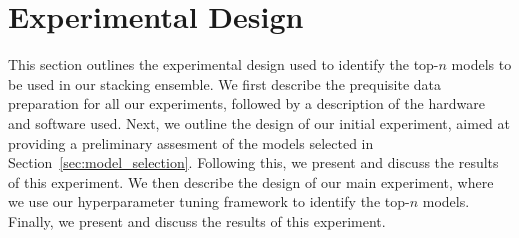 \section{Experimental Design}\label{sec:methodology}
This section outlines the experimental design used to identify the top-$n$ models to be used in our stacking ensemble.
We first describe the prequisite data preparation for all our experiments, followed by a description of the hardware and software used.
Next, we outline the design of our initial experiment, aimed at providing a preliminary assesment of the models selected in Section~\ref{sec:model_selection}.
Following this, we present and discuss the results of this experiment.
We then describe the design of our main experiment, where we use our hyperparameter tuning framework to identify the top-$n$ models.
Finally, we present and discuss the results of this experiment.



